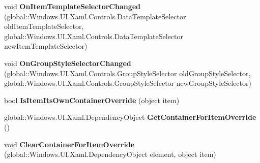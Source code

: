 \begin{DoxyCompactItemize}
\item 
\mbox{\label{interface_windows_1_1_u_i_1_1_xaml_1_1_controls_1_1_i_items_control_overrides_a30660077603ff4ebf8b8f749780afbd1}} 
void {\bfseries On\+Item\+Template\+Selector\+Changed} (global\+::\+Windows.\+U\+I.\+Xaml.\+Controls.\+Data\+Template\+Selector old\+Item\+Template\+Selector, global\+::\+Windows.\+U\+I.\+Xaml.\+Controls.\+Data\+Template\+Selector new\+Item\+Template\+Selector)
\item 
\mbox{\label{interface_windows_1_1_u_i_1_1_xaml_1_1_controls_1_1_i_items_control_overrides_ac04335f529637477b2da0ba46ef61142}} 
void {\bfseries On\+Group\+Style\+Selector\+Changed} (global\+::\+Windows.\+U\+I.\+Xaml.\+Controls.\+Group\+Style\+Selector old\+Group\+Style\+Selector, global\+::\+Windows.\+U\+I.\+Xaml.\+Controls.\+Group\+Style\+Selector new\+Group\+Style\+Selector)
\item 
\mbox{\label{interface_windows_1_1_u_i_1_1_xaml_1_1_controls_1_1_i_items_control_overrides_ad9d9073fc349d2a457c581129484ff0f}} 
bool {\bfseries Is\+Item\+Its\+Own\+Container\+Override} (object item)
\item 
\mbox{\label{interface_windows_1_1_u_i_1_1_xaml_1_1_controls_1_1_i_items_control_overrides_a623f7e1da828fb4e0ab4990fc2047874}} 
global\+::\+Windows.\+U\+I.\+Xaml.\+Dependency\+Object {\bfseries Get\+Container\+For\+Item\+Override} ()
\item 
\mbox{\label{interface_windows_1_1_u_i_1_1_xaml_1_1_controls_1_1_i_items_control_overrides_aa7629a88ebc4029aab0c438c06ec0b82}} 
void {\bfseries Clear\+Container\+For\+Item\+Override} (global\+::\+Windows.\+U\+I.\+Xaml.\+Dependency\+Object element, object item)
\item 
\mbox{\label{interface_windows_1_1_u_i_1_1_xaml_1_1_controls_1_1_i_items_control_overrides_a4ebcd3ec353d6e23fb9fc344cc643e0e}} 

\end{DoxyCompactItemize}
